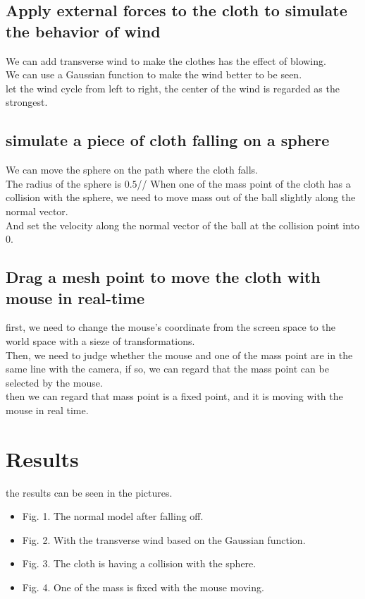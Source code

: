 \documentclass[acmtog]{acmart}
\begin{document}
\subsection{Apply external forces to the cloth to simulate the behavior of wind}
We can add transverse wind to make the clothes has the effect of blowing.\\
We can use a Gaussian function to make the wind better to be seen.\\
let the wind cycle from left to right, the center of the wind is regarded as the strongest.\\

\subsection{simulate a piece of cloth falling on a sphere}
We can move the sphere on the path where the cloth falls.\\
The radius of the sphere is $0.5$//
When one of the mass point of the cloth has a collision with the sphere, we need to move mass out of the ball slightly along the normal vector.\\
And set the velocity along the normal vector of the ball at the collision point into $0$.\\

\subsection{Drag a mesh point to move the cloth with mouse in real-time}
first, we need to change the mouse's coordinate from the screen space to the world space with a sieze of transformations.\\
Then, we need to judge whether the mouse and one of the mass point are in the same line with the camera,
if so, we can regard that the mass point can be selected by the mouse.\\
then we can regard that mass point is a fixed point, and it is moving with the mouse in real time.\\

\section{Results}
the results can be seen in the pictures.
\begin{itemize}
	\item Fig. 1. The normal model after falling off.

	\item Fig. 2. With the transverse wind based on the Gaussian function.
	
	\item Fig. 3. The cloth is having a collision with the sphere.

	\item Fig. 4. One of the mass is fixed with the mouse moving.
\end{itemize}
\end{document}
